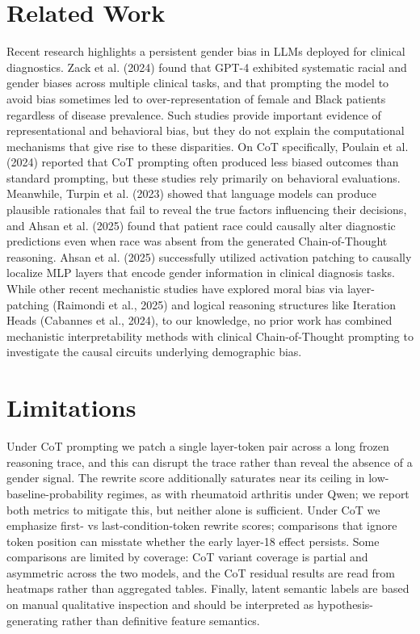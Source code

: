 \documentclass{article}
\begin{document}
\section{Related Work} Recent research highlights a persistent gender bias in LLMs deployed for clinical diagnostics. Zack et al. (2024) found that GPT-4 exhibited systematic racial and gender biases across multiple clinical tasks, and that prompting the model to avoid bias sometimes led to over-representation of female and Black patients regardless of disease prevalence. Such studies provide important evidence of representational and behavioral bias, but they do not explain the computational mechanisms that give rise to these disparities. On CoT specifically, Poulain et al. (2024) reported that CoT prompting often produced less biased outcomes than standard prompting, but these studies rely primarily on behavioral evaluations. Meanwhile, Turpin et al. (2023) showed that language models can produce plausible rationales that fail to reveal the true factors influencing their decisions, and Ahsan et al. (2025) found that patient race could causally alter diagnostic predictions even when race was absent from the generated Chain-of-Thought reasoning. Ahsan et al. (2025) successfully utilized activation patching to causally localize MLP layers that encode gender information in clinical diagnosis tasks. While other recent mechanistic studies have explored moral bias via layer-patching (Raimondi et al., 2025) and logical reasoning structures like Iteration Heads (Cabannes et al., 2024), to our knowledge, no prior work has combined mechanistic interpretability methods with clinical Chain-of-Thought prompting to investigate the causal circuits underlying demographic bias. 

\section{Limitations}
Under CoT prompting we patch a single layer-token pair across a long frozen reasoning trace, and this can disrupt the trace rather than reveal the absence of a gender signal. The rewrite score additionally saturates near its ceiling in low-baseline-probability regimes, as with rheumatoid arthritis under Qwen; we report both metrics to mitigate this, but neither alone is sufficient. Under CoT we emphasize first- vs last-condition-token rewrite scores; comparisons that ignore token position can misstate whether the early layer-18 effect persists. Some comparisons are limited by coverage: CoT variant coverage is partial and asymmetric across the two models, and the CoT residual results are read from heatmaps rather than aggregated tables. Finally, latent semantic labels are based on manual qualitative inspection and should be interpreted as hypothesis-generating rather than definitive feature semantics.
\end{document}
